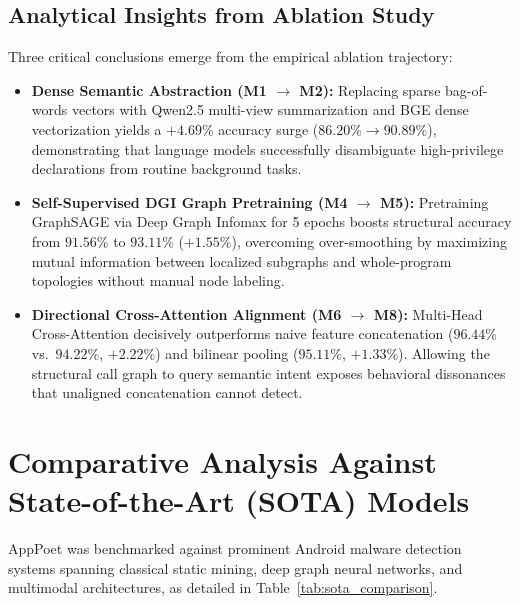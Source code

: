 \documentclass[12pt,a4paper,oneside]{report}
\begin{document}
\subsection{Analytical Insights from Ablation Study}
Three critical conclusions emerge from the empirical ablation trajectory:
\begin{itemize}
    \item \textbf{Dense Semantic Abstraction (M1 $\to$ M2):} Replacing sparse bag-of-words vectors with Qwen2.5 multi-view summarization and BGE dense vectorization yields a $+4.69\%$ accuracy surge ($86.20\% \to 90.89\%$), demonstrating that language models successfully disambiguate high-privilege declarations from routine background tasks.
    \item \textbf{Self-Supervised DGI Graph Pretraining (M4 $\to$ M5):} Pretraining GraphSAGE via Deep Graph Infomax for 5 epochs boosts structural accuracy from $91.56\%$ to $93.11\%$ ($+1.55\%$), overcoming over-smoothing by maximizing mutual information between localized subgraphs and whole-program topologies without manual node labeling.
    \item \textbf{Directional Cross-Attention Alignment (M6 $\to$ M8):} Multi-Head Cross-Attention decisively outperforms naive feature concatenation ($96.44\%$ vs.\ $94.22\%$, $+2.22\%$) and bilinear pooling ($95.11\%$, $+1.33\%$). Allowing the structural call graph to query semantic intent exposes behavioral dissonances that unaligned concatenation cannot detect.
\end{itemize}

\section{Comparative Analysis Against State-of-the-Art (SOTA) Models}
AppPoet was benchmarked against prominent Android malware detection systems spanning classical static mining, deep graph neural networks, and multimodal architectures, as detailed in Table~\ref{tab:sota_comparison}.
\end{document}
